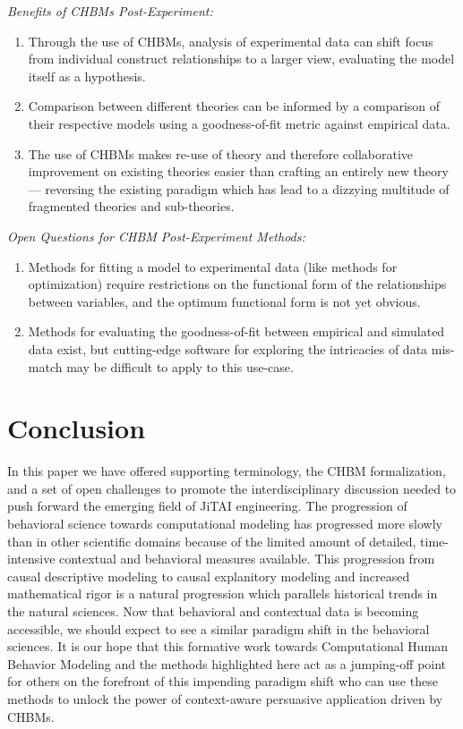 \documentclass[runningheads,a4paper]{llncs}
\begin{document}
\emph{Benefits of CHBMs Post-Experiment:}
\begin{enumerate}
    \item Through the use of CHBMs, analysis of experimental data can shift focus from individual construct relationships to a larger view, evaluating the model itself as a hypothesis.
    \item Comparison between different theories can be informed by a comparison of their respective models using a goodness-of-fit metric against empirical data.
    \item The use of CHBMs makes re-use of theory and therefore collaborative improvement on existing theories easier than crafting an entirely new theory --- reversing the existing paradigm which has lead to a dizzying multitude of fragmented theories and sub-theories.
\end{enumerate}

\emph{Open Questions for CHBM Post-Experiment Methods:}
\begin{enumerate}
    \item Methods for fitting a model to experimental data (like methods for optimization) require restrictions on the functional form of the relationships between variables, and the optimum functional form is not yet obvious.
    \item Methods for evaluating the goodness-of-fit between empirical and simulated data exist, but cutting-edge software for exploring the intricacies of data mis-match may be difficult to apply to this use-case.
\end{enumerate}

\section{Conclusion}
In this paper we have offered supporting terminology, the CHBM formalization, and a set of open challenges to promote the interdisciplinary discussion needed to push forward the emerging field of JiTAI engineering.
The progression of behavioral science towards computational modeling has progressed more slowly than in other scientific domains because of the limited amount of detailed, time-intensive contextual and behavioral measures available.
This progression from causal descriptive modeling to causal explanitory modeling and increased mathematical rigor is a natural progression which parallels historical trends in the natural sciences.
Now that behavioral and contextual data is becoming accessible, we should expect to see a similar paradigm shift in the behavioral sciences.
It is our hope that this formative work towards Computational Human Behavior Modeling and the methods highlighted here act as a jumping-off point for others on the forefront of this impending paradigm shift who can use these methods to unlock the power of context-aware persuasive application driven by CHBMs.
\end{document}
